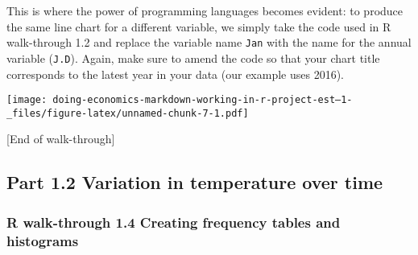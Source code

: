 \documentclass[
]{article}
\newenvironment{Shaded}{\begin{snugshade}}{\end{snugshade}}
\newcommand{\AttributeTok}[1]{\textcolor[rgb]{0.13,0.29,0.53}{#1}}
\newcommand{\CommentTok}[1]{\textcolor[rgb]{0.56,0.35,0.01}{\textit{#1}}}
\newcommand{\DecValTok}[1]{\textcolor[rgb]{0.00,0.00,0.81}{#1}}
\newcommand{\FloatTok}[1]{\textcolor[rgb]{0.00,0.00,0.81}{#1}}
\newcommand{\FunctionTok}[1]{\textcolor[rgb]{0.13,0.29,0.53}{\textbf{#1}}}
\newcommand{\NormalTok}[1]{#1}
\newcommand{\SpecialCharTok}[1]{\textcolor[rgb]{0.81,0.36,0.00}{\textbf{#1}}}
\newcommand{\StringTok}[1]{\textcolor[rgb]{0.31,0.60,0.02}{#1}}
\begin{document}
This is where the power of programming languages becomes evident: to
produce the same line chart for a different variable, we simply take the
code used in R walk-through 1.2 and replace the variable name
\texttt{Jan} with the name for the annual variable (\texttt{J.D}).
Again, make sure to amend the code so that your chart title corresponds
to the latest year in your data (our example uses 2016).

\begin{Shaded}
\end{Shaded}

\texttt{[image: doing-economics-markdown-working-in-r-project-est--1-\_files/figure-latex/unnamed-chunk-7-1.pdf]}

{[}End of walk-through{]}

\subsection{Part 1.2 Variation in temperature over
time}\label{part-1.2-variation-in-temperature-over-time}

\subsubsection{R walk-through 1.4 Creating frequency tables and
histograms}\label{r-walk-through-1.4-creating-frequency-tables-and-histograms}
\end{document}

